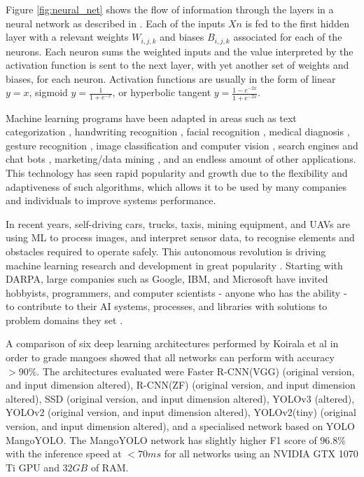 \documentclass[fleqn,twoside,12pt]{report}
\begin{document}
Figure \ref{fig:neural_net} shows the flow of information through the layers in a neural network as described in \cite{smith}. Each of the inputs $Xn$ is fed to the first hidden layer with a relevant weights $W_{i,j,k}$ and biases $B_{i,j,k}$ associated for each of the neurons. Each neuron sums the weighted inputs and the value interpreted by the activation function is sent to the next layer, with yet another set of weights and biases, for each neuron. Activation functions are usually in the form of linear $y=x$, sigmoid $y=\frac{1}{1+e^{-x}}$, or hyperbolic tangent $y=\frac{1-e^{-2x}}{1+e^{-2x}}$.

Machine learning programs have been adapted in areas such as text categorization \cite{sebastiani}, handwriting recognition \cite{bottou,bahlmann}, facial recognition \cite{bartlett,bartlett2,mohammed}, medical diagnosis \cite{shipp,ye,dreiseitl}, gesture recognition \cite{lustrek,rautaray}, image classification and computer vision \cite{chapelle,ciresan,krizhevsky}, search engines and chat bots \cite{boyan,graepel,jia}, marketing/data mining \cite{cui,bose}, and an endless amount of other applications. This technology has seen rapid popularity and growth due to the flexibility and adaptiveness of such algorithms, which allows it to be used by many companies and individuals to improve systems performance. 

In recent years, self-driving cars, trucks, taxis, mining equipment, and UAVs are using ML to process images, and interpret sensor data, to recognise elements and obstacles required to operate safely. This autonomous revolution is driving machine learning research and development in great popularity \cite{lecun}. Starting with DARPA, large companies such as Google, IBM, and Microsoft have invited hobbyists, programmers, and computer scientists - anyone who has the ability - to contribute to their AI systems, processes, and libraries with solutions to problem domains they set \cite{tensorflow,cortana,udacity,xprize}.


A comparison of six deep learning architectures performed by Koirala et al \cite{koirala} in order to grade mangoes showed that all networks can perform with accuracy $>90\%$. The architectures evaluated were Faster R-CNN(VGG) (original version, and input dimension altered), R-CNN(ZF) (original version, and input dimension altered), SSD (original version, and input dimension altered), YOLOv3 (altered), YOLOv2 (original version, and input dimension altered), YOLOv2(tiny) (original version, and input dimension altered), and a specialised network based on YOLO MangoYOLO. The MangoYOLO network has slightly higher F1 score of $96.8\%$ with the inference speed at $<70ms$ for all networks using an NVIDIA GTX 1070 Ti GPU and $32GB$ of RAM.
\end{document}
